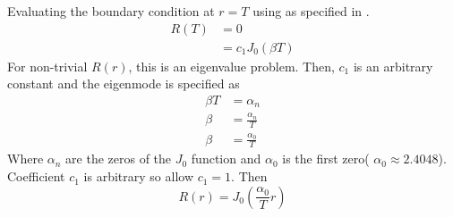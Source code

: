   Evaluating the boundary condition at $r=T$ using  as
  specified in .
  \begin{align}
    R(T) &= 0 \\
    &= c_1 J_0(\beta T)
  \end{align}
  For non-trivial $R(r)$, this is an eigenvalue problem. Then, $c_1$ is an
  arbitrary constant and the eigenmode is specified as
  \begin{align}
    \beta T &= \alpha_n \\
    \beta &= \frac{\alpha_n}{T} \\
    \label{eq:finite_cyl_beta}
    \beta &= \frac{\alpha_0}{T}
  \end{align}
  Where $\alpha_n$ are the zeros of the $J_0$ function and $\alpha_0$ is the
  first zero( $\alpha_0 \approx 2.4048$). Coefficient $c_1$ is arbitrary so 
  allow $c_1 = 1$. Then
  \begin{equation}
    \label{eq:finite_cyl_R}
    R(r) = J_0\left(\frac{\alpha_0}{T} r\right)
  \end{equation}

